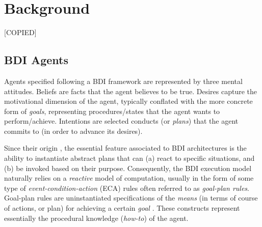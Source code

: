 \documentclass[sigconf,anonymous]{aamas}
\begin{document}

\section{Background} 
\label{sec:2}
[COPIED]
\subsection{BDI Agents}
Agents specified following a BDI framework are represented by three mental attitudes. Beliefs are facts that the agent believes to be true. Desires capture the motivational dimension of the agent, typically conflated with the more concrete form of \textit{goals}, representing procedures/states that the agent wants to perform/achieve. Intentions are selected conducts (or \textit{plans}) that the agent commits to (in order to advance its desires). 

Since their origin \cite{Rao1995}, the essential feature associated to BDI architectures is the ability to instantiate abstract plans that can (a) react to specific situations, and (b) be invoked based on their purpose. Consequently, the BDI execution model naturally relies on a \textit{reactive} model of computation, usually in the form of some type of \textit{event-condition-action} (ECA) rules often referred to as \textit{goal-plan rules}. Goal-plan rules are uninstantiated specifications of the \textit{means} (in terms of course of actions, or plan) for achieving a certain \textit{goal} \cite{Rao1995}. These constructs represent essentially the procedural knowledge (\textit{how-to}) of the agent. 
\end{document}
